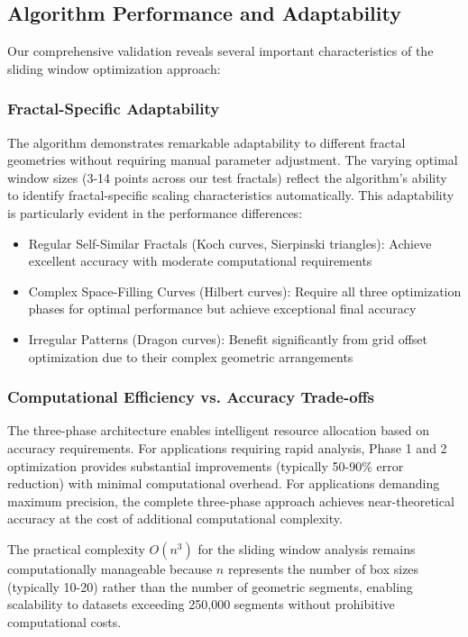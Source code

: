 \documentclass[preprint,12pt]{elsarticle}
\def\textbf#1{#1}%
\begin{document}
\subsection{Algorithm Performance and Adaptability}

Our comprehensive validation reveals several important characteristics of the sliding window optimization approach:

\subsubsection{Fractal-Specific Adaptability}

The algorithm demonstrates remarkable adaptability to different fractal geometries without requiring manual parameter adjustment. The varying optimal window sizes (3-14 points across our test fractals) reflect the algorithm's ability to identify fractal-specific scaling characteristics automatically. This adaptability is particularly evident in the performance differences:

\begin{itemize}
\item \textbf{Regular Self-Similar Fractals} (Koch curves, Sierpinski triangles): Achieve excellent accuracy with moderate computational requirements
\item \textbf{Complex Space-Filling Curves} (Hilbert curves): Require all three optimization phases for optimal performance but achieve exceptional final accuracy
\item \textbf{Irregular Patterns} (Dragon curves): Benefit significantly from grid offset optimization due to their complex geometric arrangements
\end{itemize}

\subsubsection{Computational Efficiency vs. Accuracy Trade-offs}

The three-phase architecture enables intelligent resource allocation based on accuracy requirements. For applications requiring rapid analysis, Phase 1 and 2 optimization provides substantial improvements (typically 50-90\% error reduction) with minimal computational overhead. For applications demanding maximum precision, the complete three-phase approach achieves near-theoretical accuracy at the cost of additional computational complexity.

The practical complexity $O(n^3)$ for the sliding window analysis remains computationally manageable because $n$ represents the number of box sizes (typically 10-20) rather than the number of geometric segments, enabling scalability to datasets exceeding 250,000 segments without prohibitive computational costs.
\end{document}
